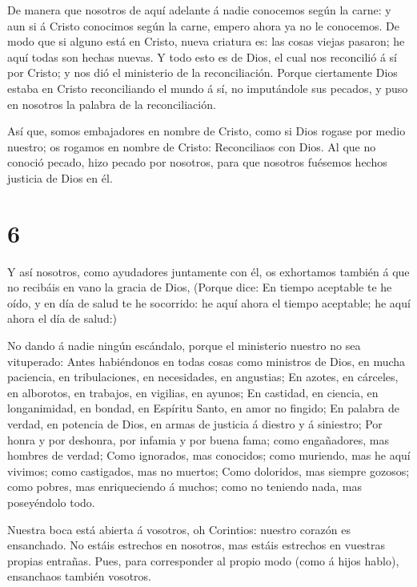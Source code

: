  De manera que nosotros de aquí adelante á nadie conocemos
según la carne: y aun si á Cristo conocimos según la carne, empero ahora
ya no le conocemos.  De modo que si alguno está en Cristo,
nueva criatura es: las cosas viejas pasaron; he aquí todas son hechas
nuevas.  Y todo esto es de Dios, el cual nos reconcilió á
sí por Cristo; y nos dió el ministerio de la reconciliación.
 Porque ciertamente Dios estaba en Cristo reconciliando el
mundo á sí, no imputándole sus pecados, y puso en nosotros la palabra de
la reconciliación.

 Así que, somos embajadores en nombre de Cristo, como si
Dios rogase por medio nuestro; os rogamos en nombre de Cristo:
Reconciliaos con Dios.  Al que no conoció pecado, hizo
pecado por nosotros, para que nosotros fuésemos hechos justicia de Dios
en él.

\hypertarget{section-5}{%
\section{6}\label{section-5}}

 Y así nosotros, como ayudadores juntamente con él, os
exhortamos también á que no recibáis en vano la gracia de Dios,
 (Porque dice: En tiempo aceptable te he oído, y en día de
salud te he socorrido: he aquí ahora el tiempo aceptable; he aquí ahora
el día de salud:)

 No dando á nadie ningún escándalo, porque el ministerio
nuestro no sea vituperado:  Antes habiéndonos en todas cosas
como ministros de Dios, en mucha paciencia, en tribulaciones, en
necesidades, en angustias;  En azotes, en cárceles, en
alborotos, en trabajos, en vigilias, en ayunos;  En
castidad, en ciencia, en longanimidad, en bondad, en Espíritu Santo, en
amor no fingido;  En palabra de verdad, en potencia de Dios,
en armas de justicia á diestro y á siniestro;  Por honra y
por deshonra, por infamia y por buena fama; como engañadores, mas
hombres de verdad;  Como ignorados, mas conocidos; como
muriendo, mas he aquí vivimos; como castigados, mas no muertos;
 Como doloridos, mas siempre gozosos; como pobres, mas
enriqueciendo á muchos; como no teniendo nada, mas poseyéndolo todo.

 Nuestra boca está abierta á vosotros, oh Corintios:
nuestro corazón es ensanchado.  No estáis estrechos en
nosotros, mas estáis estrechos en vuestras propias entrañas.
 Pues, para corresponder al propio modo (como á hijos
hablo), ensanchaos también vosotros.

